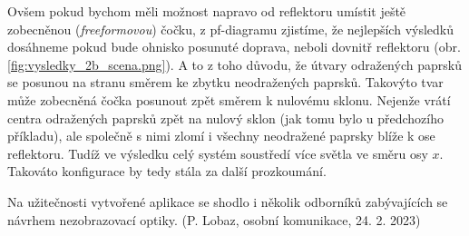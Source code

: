 Ovšem pokud bychom měli možnost napravo od reflektoru umístit ještě zobecněnou (\emph{freeformovou}) čočku, z pf-diagramu zjistíme, že nejlepších výsledků dosáhneme pokud bude ohnisko posunuté doprava, neboli dovnitř reflektoru (obr. \ref{fig:vysledky_2b_scena.png}). A to z toho důvodu, že útvary odražených paprsků se posunou na stranu směrem ke zbytku neodražených paprsků. Takovýto tvar může zobecněná čočka posunout zpět směrem k nulovému sklonu. Nejenže vrátí centra odražených paprsků zpět na nulový sklon (jak tomu bylo u předchozího příkladu), ale společně s nimi zlomí i všechny neodražené paprsky blíže k ose reflektoru. Tudíž ve výsledku celý systém soustředí více světla ve směru osy $x$. Takováto konfigurace by tedy stála za další prozkoumání.

Na užitečnosti vytvořené aplikace se shodlo i několik odborníků zabývajících se návrhem nezobrazovací optiky. (P. Lobaz, osobní komunikace, 24. 2. 2023)
